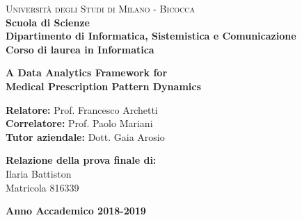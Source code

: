 \documentclass[a4paper,12pt]{report}
\begin{document}
	
	\begin{titlepage}
		
		\begin{minipage}[t]{0.19\textwidth}
		\end{minipage}
		\begin{minipage}[t]{0.81\textwidth}
			{
				{\textsc{Università degli Studi di Milano - Bicocca}} \\
				\textbf{Scuola di Scienze} \\
				\textbf{Dipartimento di Informatica, Sistemistica e Comunicazione} \\
				\textbf{Corso di laurea in Informatica} \\
				\par
			}
		\end{minipage}
		
		\vspace{40mm}
		
		\begin{center}
			{\LARGE{
					\textbf{A Data Analytics Framework for \\Medical Prescription Pattern Dynamics}
					\par
			}}
		\end{center}
		
		\vspace{40mm}
		
		{\large \textbf{Relatore:} Prof. Francesco Archetti \medskip} \\
		{\large \textbf{Correlatore:} Prof. Paolo Mariani \medskip} \\
		{\large \textbf{Tutor aziendale:} Dott. Gaia Arosio \medskip} \\
		
		\vspace{15mm}
		
		\begin{flushright}
			{\large \textbf{Relazione della prova finale di:}} \\
			\large{Ilaria Battiston} \\
			\large{Matricola 816339} 
		\end{flushright}
		
		\vspace{30mm}
		\begin{center}
			{\large{\bf Anno Accademico 2018-2019}}
		\end{center}
		
		\restoregeometry
		
	\end{titlepage}
    
\end{document}
